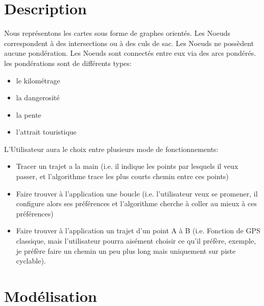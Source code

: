 \section{Description}
Nous représentons les cartes sous forme de graphes orientés.
Les Noeuds correspondent à des intersections ou à des culs de sac.
Les Noeuds ne possèdent aucune pondération.
Les Noeuds sont connectés entre eux via des arcs pondérés. les pondérations sont de différents
types:
\begin{itemize}
  \item le kilométrage
  \item la dangerosité
  \item la pente
  \item l'attrait touristique
\end{itemize}
L'Utilisateur aura le choix entre plusieurs mode de fonctionnements:
\begin{itemize}
  \item Tracer un trajet a la main (i.e. il indique les points par lesquels il veux passer, et l'algorithme trace les plus courts chemin entre ces points)
  \item Faire trouver à l'application une boucle (i.e. l'utilisateur veux se promener, il configure alors ses préférences et l'algorithme cherche à coller au mieux à ces préférences)
  \item Faire trouver à l'application un trajet d'un point A à B (i.e. Fonction de GPS classique, mais l'utilisateur pourra aisément choisir ce qu'il préfère, exemple, je préfère faire un chemin un peu plus long mais uniquement sur piste cyclable).
\end{itemize}
\section{Modélisation}

